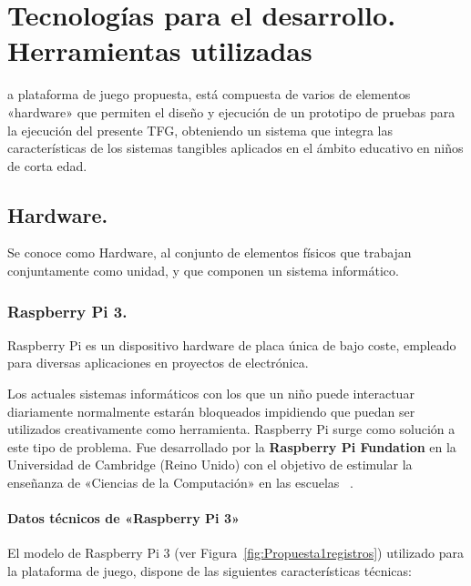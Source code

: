 \chapter{Tecnologías para el desarrollo. Herramientas utilizadas}
\noindent
{}a plataforma de juego propuesta, está compuesta de varios de elementos «hardware» que permiten el diseño y ejecución de un prototipo de pruebas para la ejecución del presente TFG, obteniendo un sistema que integra las características de los sistemas tangibles aplicados en el ámbito educativo en niños de corta edad.

\section{Hardware.}

Se conoce como Hardware, al conjunto de elementos físicos que trabajan conjuntamente como unidad, y que componen un sistema informático.

\subsection{Raspberry Pi 3.}

Raspberry Pi es un dispositivo hardware de placa única de bajo coste, empleado para diversas aplicaciones en proyectos de electrónica.\

Los actuales sistemas informáticos con los que un niño puede interactuar diariamente normalmente estarán bloqueados impidiendo que puedan ser utilizados creativamente como herramienta. Raspberry Pi surge como solución a este tipo de problema. Fue desarrollado por la \textbf{Raspberry Pi Fundation} en la Universidad de Cambridge (Reino Unido) con el objetivo de estimular la enseñanza de «Ciencias de la Computación» en las escuelas ~\cite{Upton}. 

\subsubsection{Datos técnicos de «Raspberry Pi 3»}

El modelo de Raspberry Pi 3 (ver Figura~\ref{fig:Propuesta1registros}) utilizado para la plataforma de juego, dispone de las siguientes características técnicas:

